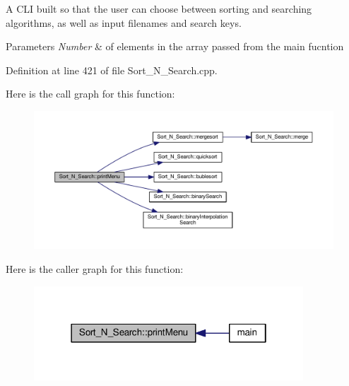 A C\-L\-I built so that the user can choose between sorting and searching algorithms, as well as input filenames and search keys. 


\begin{DoxyParams}{Parameters}
{\em Number} & of elements in the array passed from the main fucntion \\
\hline
\end{DoxyParams}


Definition at line 421 of file Sort\-\_\-\-N\-\_\-\-Search.\-cpp.



Here is the call graph for this function\-:\nopagebreak
\begin{figure}[H]
\begin{center}
\leavevmode
\includegraphics[width=350pt]{class_sort___n___search_a63c1e873a63857191d90c088147ee083_cgraph}
\end{center}
\end{figure}




Here is the caller graph for this function\-:\nopagebreak
\begin{figure}[H]
\begin{center}
\leavevmode
\includegraphics[width=286pt]{class_sort___n___search_a63c1e873a63857191d90c088147ee083_icgraph}
\end{center}
\end{figure}


